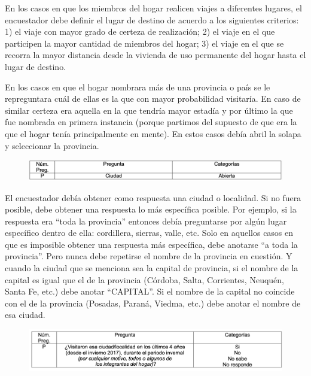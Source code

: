 \documentclass[
  openany]{book}
\begin{document}
En los casos en que los miembros del hogar realicen viajes a diferentes lugares, el encuestador debe definir el lugar de destino de acuerdo a los siguientes criterios: 1) el viaje con mayor grado de certeza de realización; 2) el viaje en el que participen la mayor cantidad de miembros del hogar; 3) el viaje en el que se recorra la mayor distancia desde la vivienda de uso permanente del hogar hasta el lugar de destino.

En los casos en que el hogar nombrara más de una provincia o país se le repreguntara cuál de ellas es la que con mayor probabilidad visitaría. En caso de similar certeza era aquella en la que tendría mayor estadía y por último la que fue nombrada en primera instancia (porque partimos del supuesto de que era la que el hogar tenía principalmente en mente). En estos casos debía abril la solapa y seleccionar la provincia.

\begin{figure}

{\centering \includegraphics[width=1\linewidth]{imagenes/figura6-309} 

}

\end{figure}

El encuestador debía obtener como respuesta una ciudad o localidad. Si no fuera posible, debe obtener una respuesta lo más específica posible. Por ejemplo, si la respuesta era ``toda la provincia'' entonces debía preguntarse por algún lugar específico dentro de ella: cordillera, sierras, valle, etc. Solo en aquellos casos en que es imposible obtener una respuesta más específica, debe anotarse ``a toda la provincia''. Pero nunca debe repetirse el nombre de la provincia en cuestión. Y cuando la ciudad que se menciona sea la capital de provincia, si el nombre de la capital es igual que el de la provincia (Córdoba, Salta, Corrientes, Neuquén, Santa Fe, etc.) debe anotar ``CAPITAL''. Si el nombre de la capital no coincide con el de la provincia (Posadas, Paraná, Viedma, etc.) debe anotar el nombre de esa ciudad.

\begin{figure}

{\centering \includegraphics[width=1\linewidth]{imagenes/figura6-310} 

}

\end{figure}
\end{document}
